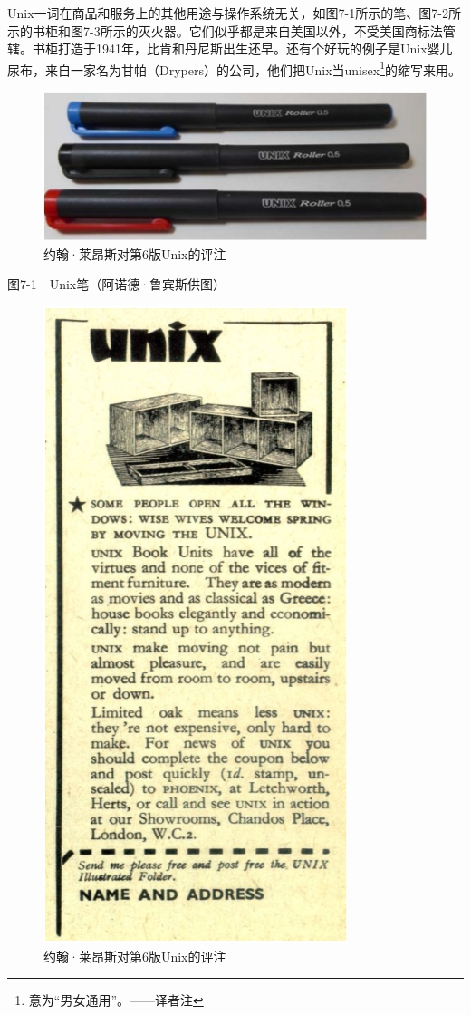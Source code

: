 \documentclass[a4paper,12pt,UTF8,twoside]{ctexbook}
\begin{document}
Unix一词在商品和服务上的其他用途与操作系统无关，如图7-1所示的笔、图7-2所示的书柜和图7-3所示的灭火器。它们似乎都是来自美国以外，不受美国商标法管辖。书柜打造于1941年，比肯和丹尼斯出生还早。还有个好玩的例子是Unix婴儿尿布，来自一家名为甘帕（Drypers）的公司，他们把Unix当unisex\footnote{意为“男女通用”。——译者注}的缩写来用。

\begin{figure}[htbp]
	\centering
	\includegraphics[width=0.7\linewidth]{63}
	\caption{约翰·莱昂斯对第6版Unix的评注}
	\label{fig:1}
\end{figure}


图7-1　Unix笔（阿诺德·鲁宾斯供图）

\begin{figure}[htbp]
	\centering
	\includegraphics[width=0.7\linewidth]{64}
	\caption{约翰·莱昂斯对第6版Unix的评注}
	\label{fig:1}
\end{figure}
\end{document}
